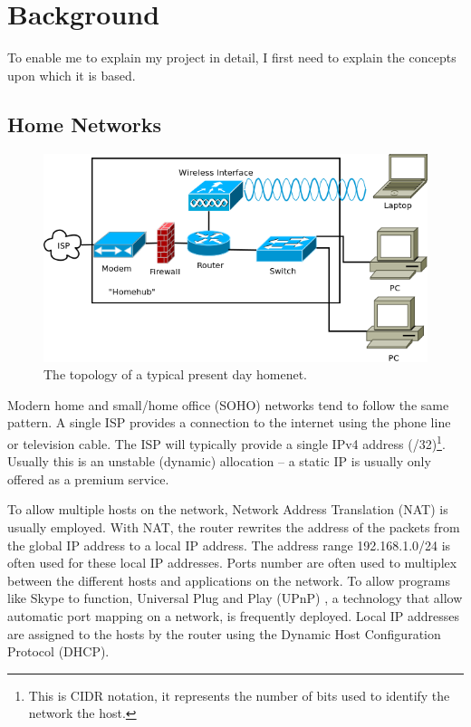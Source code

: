 \documentclass[12pt,a4paper,twoside]{report}
\begin{document}
\chapter{Background}
To enable me to explain my project in detail, I first need to explain the
concepts upon which it is based.

\section{Home Networks}

\begin{figure}
\begin{center}
  \includegraphics[width=\linewidth]{../Diagrams/Network/TypicalHomenet.png}
	\caption{The topology of a typical present day homenet.}\label{fig:typical_homenet}
\end{center}
\end{figure}

Modern home and small/home office (SOHO)  networks tend to follow the same pattern. A single ISP provides a
connection to the internet using the phone line or television cable.  The ISP
will typically provide a single IPv4 address (/32)\footnote{This is CIDR
notation, it represents the number of bits used to identify the network the
host.}. Usually this is an unstable (dynamic) allocation -- a static IP is
usually only offered as a premium service. 

To allow multiple hosts on the network, Network Address Translation (NAT)
 is usually employed. With NAT,
the router rewrites the address of the packets from the global IP address to a
local IP address. The address range 192.168.1.0/24 is often used for these
local IP addresses. Ports number are often used to multiplex between the
different hosts and applications on the network. To allow programs like Skype
to function, Universal Plug and Play (UPnP) , a technology that allow automatic port mapping on a network, is
frequently deployed. Local IP addresses are assigned to the hosts by the router
using the Dynamic Host Configuration Protocol (DHCP). 
\end{document}
